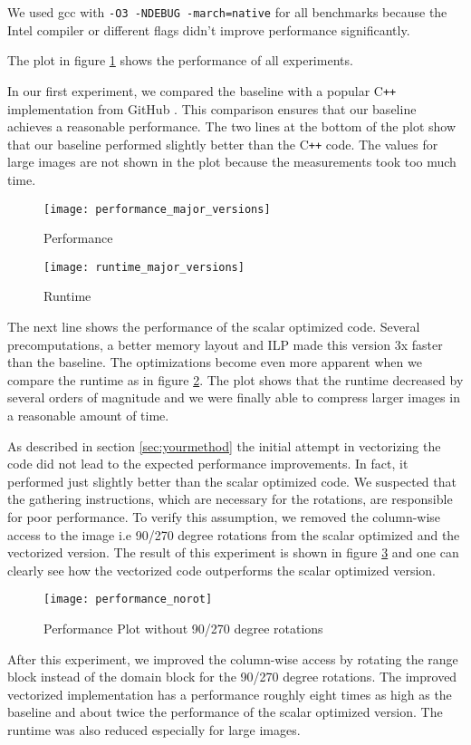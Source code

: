 We used gcc with \verb|-O3 -NDEBUG -march=native| for all benchmarks because the
Intel compiler or different flags didn't improve performance significantly.

 The plot in figure \ref{fig:perf} shows the performance of all
experiments.

In our first experiment, we compared the baseline with a popular C\texttt{++}
implementation from GitHub \cite{github-cpp}. This comparison ensures that our baseline
achieves a reasonable performance. The two lines at the bottom of the plot
show that our baseline performed slightly better than the C\texttt{++} code. The values for large
images are not shown in the plot because the measurements took too much time.

\begin{figure}[H]
  \centering
  \texttt{[image: performance\_major\_versions]}
  \caption{Performance}
  \label{fig:perf}
\end{figure}


\begin{figure}[H]
  \centering
  \texttt{[image: runtime\_major\_versions]}
  \caption{Runtime}
  \label{fig:runtime}
\end{figure}

The next line shows the performance of the scalar optimized code. Several precomputations, a better
memory layout and ILP made this version 3x faster than the baseline. The optimizations become even
more apparent when we compare the runtime as in figure \ref{fig:runtime}. The plot shows that the runtime
decreased by several orders of magnitude and we were finally able to compress larger images in a reasonable
amount of time.


As described in section \ref{sec:yourmethod} the initial attempt in vectorizing the code did not lead
to the expected performance improvements. In fact, it performed just slightly better than the scalar optimized code.
We suspected that the gathering instructions, which are necessary for the rotations, are responsible for poor performance.
To verify this assumption, we removed the column-wise access to the image i.e 90/270 degree rotations from the scalar optimized and the vectorized version.
The result of this experiment is shown in figure \ref{fig:perf_40_41} and one can clearly see how the vectorized
code outperforms the scalar optimized version.

\begin{figure}[H]
  \centering
  \texttt{[image: performance\_norot]}
  \caption{Performance Plot without 90/270 degree rotations}
  \label{fig:perf_40_41}
\end{figure}


After this experiment, we improved the column-wise access by rotating the range
block instead of the domain block for the 90/270 degree rotations. The improved
vectorized implementation has a performance roughly eight times as high as the
baseline and about twice the performance of the scalar optimized version. The
runtime was also reduced especially for large images.
